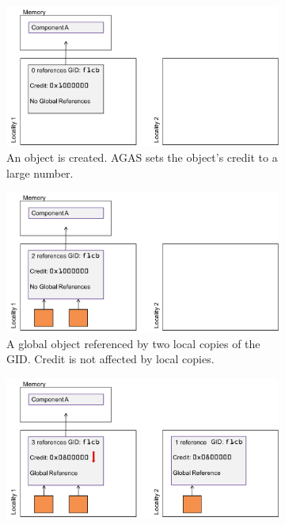 \begin{enumerate}
        \begin{figure}[t]
            \centering
            \begin{subfigure}[t]{0.49\textwidth}
                \includegraphics[width=\textwidth]{illustrations/reference_counting_1}
                \caption{An object is created. AGAS sets the object's credit to a large
                  number.}
                \label{fig:agas_credit_1}
            \end{subfigure}
            \vspace{2em}
            \hfill
            \begin{subfigure}[t]{0.49\textwidth}
                \includegraphics[width=\textwidth]{illustrations/reference_counting_2}
                \caption{A global object referenced by two local copies of the GID. Credit is not affected by local copies.}
                \label{fig:agas_credit_2}
            \end{subfigure}
            \begin{subfigure}[t]{0.49\textwidth}
                \includegraphics[width=\textwidth]{illustrations/reference_counting_3}

\end{subfigure}
\end{figure}
\end{enumerate}
